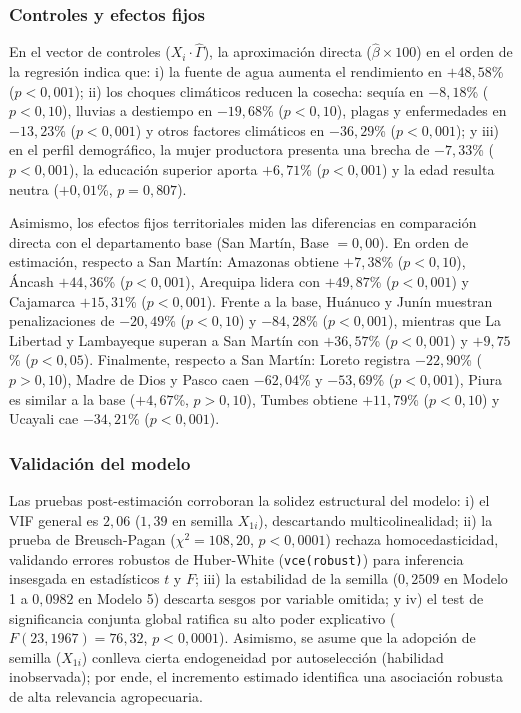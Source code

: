 \documentclass[11pt,a4paper,twocolumn]{article}
\begin{document}
\subsubsection{Controles y efectos fijos}
En el vector de controles ($X_i \cdot \hat{\Gamma}$), la aproximación directa ($\hat{\beta} \times 100$) en el orden de la regresión indica que: i) la fuente de agua aumenta el rendimiento en $+48{,}58$\% ($p < 0{,}001$); ii) los choques climáticos reducen la cosecha: sequía en $-8{,}18$\% ($p < 0{,}10$), lluvias a destiempo en $-19{,}68$\% ($p < 0{,}10$), plagas y enfermedades en $-13{,}23$\% ($p < 0{,}001$) y otros factores climáticos en $-36{,}29$\% ($p < 0{,}001$); y iii) en el perfil demográfico, la mujer productora presenta una brecha de $-7{,}33$\% ($p < 0{,}001$), la educación superior aporta $+6{,}71$\% ($p < 0{,}001$) y la edad resulta neutra ($+0{,}01$\%, $p = 0{,}807$).

Asimismo, los efectos fijos territoriales miden las diferencias en comparación directa con el departamento base (San Martín, Base $= 0{,}00$). En orden de estimación, respecto a San Martín: Amazonas obtiene $+7{,}38$\% ($p < 0{,}10$), Áncash $+44{,}36$\% ($p < 0{,}001$), Arequipa lidera con $+49{,}87$\% ($p < 0{,}001$) y Cajamarca $+15{,}31$\% ($p < 0{,}001$). Frente a la base, Huánuco y Junín muestran penalizaciones de $-20{,}49$\% ($p < 0{,}10$) y $-84{,}28$\% ($p < 0{,}001$), mientras que La Libertad y Lambayeque superan a San Martín con $+36{,}57$\% ($p < 0{,}001$) y $+9{,}75$\% ($p < 0{,}05$). Finalmente, respecto a San Martín: Loreto registra $-22{,}90$\% ($p > 0{,}10$), Madre de Dios y Pasco caen $-62{,}04$\% y $-53{,}69$\% ($p < 0{,}001$), Piura es similar a la base ($+4{,}67$\%, $p > 0{,}10$), Tumbes obtiene $+11{,}79$\% ($p < 0{,}10$) y Ucayali cae $-34{,}21$\% ($p < 0{,}001$).

\subsubsection{Validación del modelo}
Las pruebas post-estimación corroboran la solidez estructural del modelo: i) el VIF general es $2{,}06$ ($1{,}39$ en semilla $X_{1i}$), descartando multicolinealidad; ii) la prueba de Breusch-Pagan ($\chi^2 = 108{,}20$, $p < 0{,}0001$) rechaza homocedasticidad, validando errores robustos de Huber-White (\texttt{vce(robust)}) para inferencia insesgada en estadísticos $t$ y $F$; iii) la estabilidad de la semilla ($0{,}2509$ en Modelo 1 a $0{,}0982$ en Modelo 5) descarta sesgos por variable omitida; y iv) el test de significancia conjunta global ratifica su alto poder explicativo ($F(23, 1967) = 76{,}32$, $p < 0{,}0001$). Asimismo, se asume que la adopción de semilla ($X_{1i}$) conlleva cierta endogeneidad por autoselección (habilidad inobservada); por ende, el incremento estimado identifica una asociación robusta de alta relevancia agropecuaria.
\end{document}
